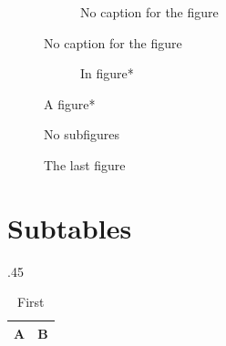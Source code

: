 \expandafter\documentclass\expandafter[\CLSOPT]{\CLS}
\begin{document}
\begin{figure}[htbp]
  \centering
  \begin{subfigure}[t]{.45\linewidth}
    \centering\SCLimage{2cm}{1cm}
    \caption{No caption for the figure}
  \end{subfigure}
\end{figure}

\begin{figure}[htbp]
  \centering
  \begin{subfigure}{.3\linewidth}
    \centering\SCLimage{2cm}{1cm}
    \caption{In figure*}\label{fig:fifth-a}
  \end{subfigure}
  \caption{A figure*}
\end{figure}

\begin{figure}[htbp]
  \centering
  \caption{No subfigures}
\end{figure}

\begin{figure}[htbp]
  \centering
  \caption{The last figure}
\end{figure}

\section*{Subtables}

\begin{table}[htbp]
  \centering
  \caption{Caption above the subtables}\label{tab:first}
  \begin{subtable}{.45\linewidth}
    \centering
    \caption{First}%
    \label{tab:first-a}
    \begin{tabular}{ll}\hline A & B\\\hline\end{tabular}
  \end{subtable}\hfill
\end{table}
\end{document}

